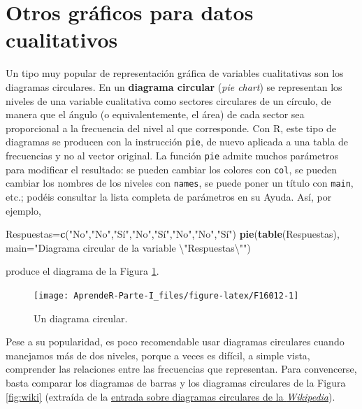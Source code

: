 \documentclass[]{book}
\newenvironment{Shaded}{\begin{snugshade}}{\end{snugshade}}
\newcommand{\CharTok}[1]{\textcolor[rgb]{0.31,0.60,0.02}{#1}}
\newcommand{\DataTypeTok}[1]{\textcolor[rgb]{0.13,0.29,0.53}{#1}}
\newcommand{\KeywordTok}[1]{\textcolor[rgb]{0.13,0.29,0.53}{\textbf{#1}}}
\newcommand{\NormalTok}[1]{#1}
\newcommand{\StringTok}[1]{\textcolor[rgb]{0.31,0.60,0.02}{#1}}
\theoremstyle{definition}
\theoremstyle{definition}
\theoremstyle{definition}
\theoremstyle{remark}
\begin{document}
\hypertarget{otros-graficos-para-datos-cualitativos}{%
\section{Otros gráficos para datos cualitativos}\label{otros-graficos-para-datos-cualitativos}}

Un tipo muy popular de representación gráfica de variables cualitativas son los diagramas circulares. En un \textbf{diagrama circular} (\emph{pie chart}) se representan los niveles de una variable cualitativa como sectores circulares de un círculo, de manera que el ángulo (o equivalentemente, el área) de cada sector sea proporcional a la frecuencia del nivel al que corresponde. Con R, este tipo de diagramas se producen con la instrucción \texttt{pie}, de nuevo aplicada a una tabla de frecuencias y no al vector original. La función \texttt{pie} admite muchos parámetros para modificar el resultado: se pueden cambiar los colores con \texttt{col}, se pueden cambiar los nombres de los niveles con \texttt{names}, se puede poner un título con \texttt{main}, etc.;
podéis consultar la lista completa de parámetros en su Ayuda.
Así, por ejemplo,

\begin{Shaded}
\begin{Highlighting}[]
\NormalTok{Respuestas=}\KeywordTok{c}\NormalTok{(}\StringTok{"No"}\NormalTok{,}\StringTok{"No"}\NormalTok{,}\StringTok{"Sí"}\NormalTok{,}\StringTok{"No"}\NormalTok{,}\StringTok{"Sí"}\NormalTok{,}\StringTok{"No"}\NormalTok{,}\StringTok{"No"}\NormalTok{,}\StringTok{"Sí"}\NormalTok{)}
\KeywordTok{pie}\NormalTok{(}\KeywordTok{table}\NormalTok{(Respuestas), }\DataTypeTok{main=}\StringTok{"Diagrama circular de la variable }\CharTok{\textbackslash{}"}\StringTok{Respuestas}\CharTok{\textbackslash{}"}\StringTok{"}\NormalTok{)}
\end{Highlighting}
\end{Shaded}

produce el diagrama de la Figura \ref{fig:F16012}.

\begin{figure}

{\centering \texttt{[image: AprendeR-Parte-I\_files/figure-latex/F16012-1]} 

}

\caption{Un diagrama circular.}\label{fig:F16012}
\end{figure}

Pese a su popularidad, es poco recomendable usar diagramas circulares cuando manejamos más de dos niveles, porque a veces es difícil, a simple vista, comprender las relaciones entre las frecuencias que representan. Para convencerse, basta comparar los diagramas de barras y los diagramas circulares de la Figura \ref{fig:wiki} (extraída de la
\href{http://en.wikipedia.org/wiki/Pie_chart}{entrada sobre diagramas circulares de la \emph{Wikipedia}}).
\end{document}
